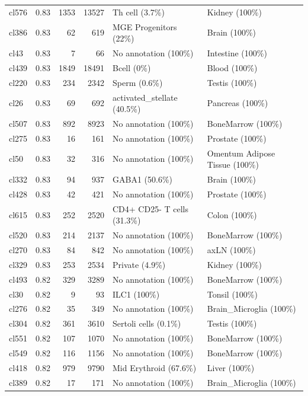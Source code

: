 \begin{table}[ht!]
\begin{tabular}{lrrrll}
  cl576 & 0.83 & 1353 & 13527 & Th cell (3.7\%) & Kidney (100\%) \\ 
  cl386 & 0.83 &  62 & 619 & MGE Progenitors (22\%) & Brain (100\%) \\ 
  cl43 & 0.83 &   7 &  66 & No annotation (100\%) & Intestine (100\%) \\ 
  cl439 & 0.83 & 1849 & 18491 & Bcell (0\%) & Blood (100\%) \\ 
  cl220 & 0.83 & 234 & 2342 & Sperm (0.6\%) & Testis (100\%) \\ 
  cl26 & 0.83 &  69 & 692 & activated\_stellate (40.5\%) & Pancreas (100\%) \\ 
  cl507 & 0.83 & 892 & 8923 & No annotation (100\%) & BoneMarrow (100\%) \\ 
  cl275 & 0.83 &  16 & 161 & No annotation (100\%) & Prostate (100\%) \\ 
  cl50 & 0.83 &  32 & 316 & No annotation (100\%) & Omentum Adipose Tissue (100\%) \\ 
  cl332 & 0.83 &  94 & 937 & GABA1 (50.6\%) & Brain (100\%) \\ 
  cl428 & 0.83 &  42 & 421 & No annotation (100\%) & Prostate (100\%) \\ 
  cl615 & 0.83 & 252 & 2520 & CD4+ CD25- T cells (31.3\%) & Colon (100\%) \\ 
  cl520 & 0.83 & 214 & 2137 & No annotation (100\%) & BoneMarrow (100\%) \\ 
  cl270 & 0.83 &  84 & 842 & No annotation (100\%) & axLN (100\%) \\ 
  cl329 & 0.83 & 253 & 2534 & Private (4.9\%) & Kidney (100\%) \\ 
  cl493 & 0.82 & 329 & 3289 & No annotation (100\%) & BoneMarrow (100\%) \\ 
  cl30 & 0.82 &   9 &  93 & ILC1 (100\%) & Tonsil (100\%) \\ 
  cl276 & 0.82 &  35 & 349 & No annotation (100\%) & Brain\_Microglia (100\%) \\ 
  cl304 & 0.82 & 361 & 3610 & Sertoli cells (0.1\%) & Testis (100\%) \\ 
  cl551 & 0.82 & 107 & 1070 & No annotation (100\%) & BoneMarrow (100\%) \\ 
  cl549 & 0.82 & 116 & 1156 & No annotation (100\%) & BoneMarrow (100\%) \\ 
  cl418 & 0.82 & 979 & 9790 & Mid Erythroid (67.6\%) & Liver (100\%) \\ 
  cl389 & 0.82 &  17 & 171 & No annotation (100\%) & Brain\_Microglia (100\%) \\ 

\end{tabular}
\end{table}
